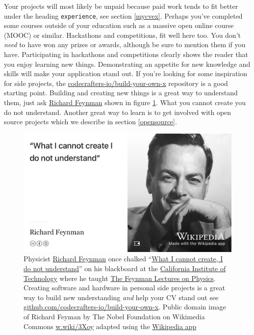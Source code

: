 \documentclass[
]{book}
\begin{document}
Your projects will most likely be unpaid because paid work tends to fit better under the heading \texttt{experience}, see section \ref{mycvex}. Perhaps you've completed some courses outside of your education such as a massive open online course (MOOC) or similar. Hackathons and competitions, fit well here too. \citep{hafb} You don't \emph{need} to have won any prizes or awards, although be sure to mention them if you have. Participating in hackathons and competitions clearly shows the reader that you enjoy learning new things. Demonstrating an appetite for new knowledge and skills will make your application stand out. If you're looking for some inspiration for side projects, the \href{https://github.com/codecrafters-io/build-your-own-x}{codecrafters-io/build-your-own-x} repository is a good starting point. Building and creating new things is a great way to understand them, just ask \href{https://en.wikipedia.org/wiki/Richard_Feynman}{Richard Feynman} shown in figure \ref{fig:feynman-fig}. What you cannot create you do not understand. Another great way to learn is to get involved with open source projects which we describe in section \ref{opensource}.

\begin{figure}

{\centering \includegraphics[width=1\linewidth]{images/what-I-cannot-create-I-do-not-understand} 

}

\caption{Physicist \href{https://en.wikipedia.org/wiki/Richard_Feynman}{Richard Feynman} once chalked ``\href{https://calisphere.org/item/b3e8d3cb9b8adc01314dba1b1f1fcf84/}{What I cannot create, I do not understand}'' on his blackboard at the \href{https://en.wikipedia.org/wiki/California_Institute_of_Technology}{California Institute of Technology} where he taught \href{https://en.wikipedia.org/wiki/The_Feynman_Lectures_on_Physics}{The Feynman Lectures on Physics}. \citep{feynmanblackboard} Creating software and hardware in personal side projects is a great way to build new understanding \emph{and} help your CV stand out see \href{https://github.com/codecrafters-io/build-your-own-x}{github.com/codecrafters-io/build-your-own-x}. Public domain image of Richard Feyman by The Nobel Foundation on Wikimedia Commons \href{https://w.wiki/3Xoy}{w.wiki/3Xoy} adapted using the \href{https://apps.apple.com/us/app/wikipedia/id324715238}{Wikipedia app}}\label{fig:feynman-fig}
\end{figure}
\end{document}
